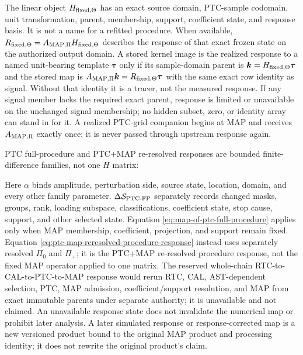 \documentclass[10pt]{article}
\begin{document}
The linear object \(H_{{\rm fixed},\Theta}\) has an exact source domain,
PTC-sample codomain, unit transformation, parent, membership, support,
coefficient state, and response basis. It is not a name for a refitted
procedure. When available,
\(R_{{\rm fixed},\Theta}=A_{{\rm MAP},\Pi}H_{{\rm fixed},\Theta}\) describes
the response of that exact frozen state on the authorized output domain.
A stored kernel image is the realized response to a named unit-bearing
template \(\boldsymbol\tau\) only if its sample-domain parent is
\(\boldsymbol k=H_{{\rm fixed},\Theta}\boldsymbol\tau\) and the stored map is
\(A_{{\rm MAP},\Pi}\boldsymbol k=R_{{\rm fixed},\Theta}\boldsymbol\tau\) with the same exact row
identity as signal. Without that identity it is a tracer, not the measured
response. If any signal member lacks the required exact parent, response is
limited or unavailable on the unchanged signal membership; no hidden subset,
zero, or identity array can stand in for it. A realized PTC-grid companion
begins at MAP and receives \(A_{{\rm MAP},\Pi}\) exactly once; it is never
passed through upstream response again.

PTC full-procedure and PTC+MAP re-resolved responses are bounded
finite-difference families, not one \(H\) matrix:

\SCIMapProcedureResponseEquations

Here \(\alpha\) binds amplitude, perturbation side, source state, location,
domain, and every other family parameter.
\(\Delta\mathcal S_{{\rm PTC}\text{-}{\rm FP}}\) separately
records changed masks, groups, rank, loading subspace, classifications,
coefficient state, stop cause, support, and other selected state. Equation
\eqref{eq:map-of-ptc-full-procedure} applies only when MAP membership,
coefficient, projection, and support remain fixed. Equation
\eqref{eq:ptc-map-reresolved-procedure-response} instead uses separately
resolved \(\Pi_0\) and \(\Pi_+\); it is the PTC+MAP re-resolved procedure
response, not the fixed MAP operator applied to one matrix. The reserved
whole-chain RTC-to-CAL-to-PTC-to-MAP response would rerun RTC, CAL,
AST-dependent selection, PTC, MAP admission, coefficient/support resolution,
and MAP from exact immutable parents under separate authority; it is
unavailable and not claimed. An unavailable response state does not invalidate the numerical map
or prohibit later analysis. A
later simulated response or response-corrected map is a new versioned product
bound to the original MAP product and processing identity; it does not rewrite
the original product's claim.
\end{document}
